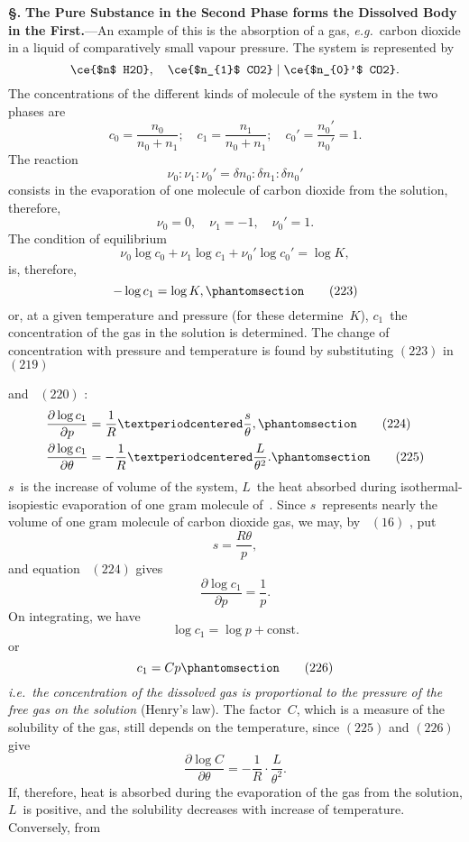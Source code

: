 \documentclass[12pt]{book}[2005/09/16]
\newcommand{\Chg}[2]{#2}
\newcommand{\Add}[1]{\Chg{}{#1}}
\newcommand{\Erratum}[2]{#2}
\newcommand{\Section}[1]{
  \medskip\par\textbf{§\;#1}
  \label{section:#1}
}
\newcommand{\Tag}[1]{%
  \phantomsection\label{eqn:#1}\tag*{\ensuremath{#1}}%
}
\newcommand{\Eq}[1]{%
  \hyperref[eqn:#1]{\ensuremath{#1}}%
}
\newcommand{\PageSep}[1]{\ignorespaces}
\newcommand{\Topic}[1]{\textbf{#1}}
\newcommand{\const}{\text{const.}}
\newcommand{\eg}{\emph{e.g.}}
\newcommand{\ie}{\emph{i.e.}}
\newcommand{\dd}{\partial}
\begin{document}
\Section{265.} \Topic{The Pure Substance in the Second Phase
forms the Dissolved Body in the First.}---An example of
this is the absorption of a gas, \eg\ carbon dioxide in a liquid
of comparatively small vapour pressure. The system is
represented by
\[
\ce{$n$ H2O},\quad
\ce{$n_{1}$ CO2} \mid
\ce{$n_{0}'$ CO2}.
\]
The concentrations of the different kinds of molecule of
the system in the two phases are
\[
c_{0} = \frac{n_{0}}{n_{0} + n_{1}};\quad
c_{1} = \frac{n_{1}}{n_{0} + n_{1}};\quad
c_{0}' = \frac{n_{0}'}{n_{0}'} = 1.
\]
\PageSep{241}
The reaction
\[
\nu_{0} : \nu_{1} : \nu_{0}' = \delta n_{0} : \delta n_{1} : \delta n_{0}'
\]
consists in the evaporation of one molecule of carbon dioxide
from the solution, therefore,
\[
\nu_{0} = 0,\quad
\nu_{1} = -1,\quad
\nu_{0}' = 1.
\]
The condition of equilibrium
\[
\nu_{0} \log c_{0} + \nu_{1} \log c_{1} + \nu_{0}' \log c_{0}' = \log K,
\]
is, therefore,
\[
-\log c_{1} = \log K,
\Tag{(223)}
\]
or, at a given temperature and pressure (for these determine~$K$),
$c_{1}$~the concentration of the gas in the solution is
determined. The change of concentration with pressure
and temperature is found by substituting \Eq{(223)} in \Eq{(219)}
and~\Eq{(220)}:
\begin{align*}
\frac{\dd \log c_{1}}{\dd p} &= \frac{1}{R} · \frac{s}{\theta}\Add{,}
\Tag{(224)} \\
\frac{\dd \log c_{1}}{\dd \theta} &= -\frac{1}{R} · \frac{L}{\Erratum{\theta_{2}}{\theta^{2}}}\Add{.}
\Tag{(225)}
\end{align*}
$s$~is the increase of volume of the system, $L$~the heat
absorbed during isothermal-isopiestic evaporation of one
gram molecule of~. Since $s$~represents nearly the
volume of one gram molecule of \Erratum{carbonic}{carbon} dioxide gas, we
may, by~\Eq{(16)}, put
\[
s = \frac{R\theta}{p},
\]
and equation~\Eq{(224)} gives
\[
\frac{\dd \log c_{1}}{\dd p} = \frac{1}{p}.
\]
\PageSep{242}
On integrating, we have
\[
\log c_{1} = \log p + \const
\]
or
\[
c_{1} = Cp
\Tag{(226)}
\]
\ie\ \emph{the concentration of the dissolved gas is proportional to the
pressure of the free gas on the solution} (Henry's law). The
%
%
factor~$C$, which is a measure of the solubility of the gas, still
depends on the temperature, since \Eq{(225)} and \Eq{(226)} give
\[
\frac{\dd \log C}{\dd \theta} = -\frac{1}{R} · \frac{L}{\Erratum{\theta_{2}}{\theta^{2}}}\Add{.}
\]
If, therefore, heat is absorbed during the evaporation of the
gas from the solution, $L$~is positive, and the solubility
decreases with increase of temperature. Conversely, from
\end{document}
